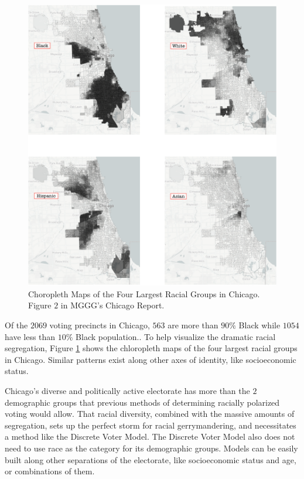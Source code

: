 \begin{figure}[ht]\centering
 \includegraphics[width=\linewidth]{figures/chi_chloropleth.png}
 \caption{Choropleth Maps of the Four Largest Racial Groups in Chicago. Figure $2$ in MGGG's Chicago Report.\cite{chi_report}}
 \label{fig:chi_chloropleth}
\end{figure}

Of the $2069$ voting precincts in Chicago, $563$ are more than $90\%$ Black while $1054$ have less than $10\%$ Black population.\cite{chi_report}. To help visualize the dramatic racial segregation, Figure \ref{fig:chi_chloropleth} shows the chloropleth maps of the four largest racial groups in Chicago. Similar patterns exist along other axes of identity, like socioeconomic status.

Chicago's diverse and politically active electorate has more than the $2$ demographic groups that previous methods of determining racially polarized voting would allow. That racial diversity, combined with the massive amounts of segregation, sets up the perfect storm for racial gerrymandering, and necessitates a method like the Discrete Voter Model. The Discrete Voter Model also does not need to use race as the category for its demographic groups. Models can be easily built along other separations of the electorate, like socioeconomic status and age, or combinations of them.

